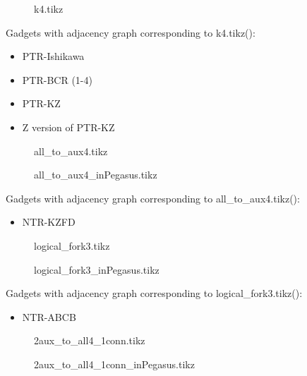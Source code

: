 \documentclass{article}
\begin{document}
\begin{figure}

\caption{k4.tikz}
\end{figure}

Gadgets with adjacency graph corresponding to k4.tikz(\scalebox{.25}{}):

\begin{itemize}
\item PTR-Ishikawa
\item PTR-BCR (1-4)
\item PTR-KZ
\item Z version of PTR-KZ 
\end{itemize}

\begin{figure}

\caption{all\_to\_aux4.tikz}
\end{figure}

\begin{figure}

\caption{all\_to\_aux4\_inPegasus.tikz}
\end{figure}

Gadgets with adjacency graph corresponding to all\_to\_aux4.tikz(\scalebox{.25}{}):

\begin{itemize}
\item NTR-KZFD 
\end{itemize}

\begin{figure}

\caption{logical\_fork3.tikz}
\end{figure}


\begin{figure}

\caption{logical\_fork3\_inPegasus.tikz}
\end{figure}

Gadgets with adjacency graph corresponding to logical\_fork3.tikz(\scalebox{.25}{}):

\begin{itemize}
\item NTR-ABCB
\end{itemize}

\begin{figure}

\caption{2aux\_to\_all4\_1conn.tikz}
\end{figure}

\begin{figure}

\caption{2aux\_to\_all4\_1conn\_inPegasus.tikz}
\end{figure}
\end{document}
